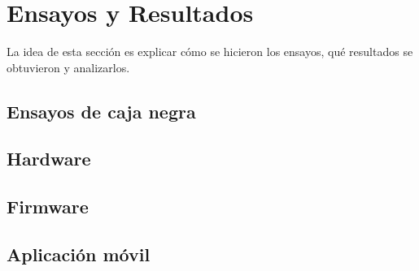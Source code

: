 
\chapter{Ensayos y Resultados} %

\label{Chapter4} %


La idea de esta sección es explicar cómo se hicieron los ensayos, qué resultados se obtuvieron y analizarlos.

\section{Ensayos de caja negra}

\section{Hardware}

\section{Firmware}

\section{Aplicación móvil}


